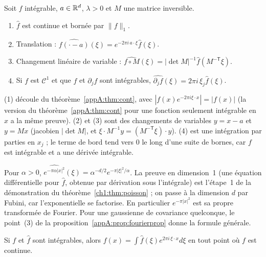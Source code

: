 \begin{proposition}\label{appA:prop:fourierprop}
Soit $f$ intégrable, $a\in\mathbb{R}^d$, $\lambda>0$ et $M$ une matrice inversible.
\begin{enumerate}
\item $\hat f$ est continue et bornée par $\|f\|_1$.
\item Translation : $\widehat{f(\cdot-a)}(\xi)=e^{-2\pi i\,a\cdot\xi}\hat f(\xi)$.
\item Changement linéaire de variable : $\widehat{f\circ M}(\xi)=|\det M|^{-1}\hat f(M^{-\mathsf T}\xi)$.
\item Si $f$ est $\mathcal C^1$ et que $f$ et $\partial_jf$ sont intégrables, $\widehat{\partial_jf}(\xi)=2\pi
i\,\xi_j\hat f(\xi)$.
\end{enumerate}
\end{proposition}

\begin{humanproof}
(1) découle du théorème~\ref{appA:thm:cont}, avec $|f(x)e^{-2\pi i\xi\cdot x}|=|f(x)|$ (la version du théorème~\ref{appA:thm:cont} pour une fonction seulement intégrable en $x$ a la même preuve). (2) et (3) sont des changements
de variables $y=x-a$ et $y=Mx$ (jacobien $|\det M|$, et $\xi\cdot M^{-1}y=(M^{-\mathsf T}\xi)\cdot y$). (4) est une
intégration par parties en $x_j$ ; le terme de bord tend vers $0$ le long d'une suite de bornes, car $f$ est intégrable
et a une dérivée intégrable.
\end{humanproof}

\begin{example}[Gaussiennes]\label{appA:ex:gauss}
Pour $\alpha>0$, $\widehat{e^{-\pi\alpha|x|^2}}(\xi)=\alpha^{-d/2}e^{-\pi|\xi|^2/\alpha}$. La preuve en dimension~1
(une équation différentielle pour $\hat f$, obtenue par dérivation sous l'intégrale) est l'étape~1 de la démonstration
du théorème~\ref{ch1:thm:poisson} ; on passe à la dimension $d$ par Fubini, car l'exponentielle se factorise. En
particulier $e^{-\pi|x|^2}$ est sa propre transformée de Fourier. Pour une gaussienne de covariance quelconque,
le point~(3) de la proposition~\ref{appA:prop:fourierprop} donne la formule générale.
\end{example}

\begin{theorem}\label{appA:thm:inversion}
Si $f$ et $\hat f$ sont intégrables, alors $f(x)=\int\hat f(\xi)e^{2\pi i\,\xi\cdot x}d\xi$ en tout point où $f$ est
continue.
\end{theorem}

